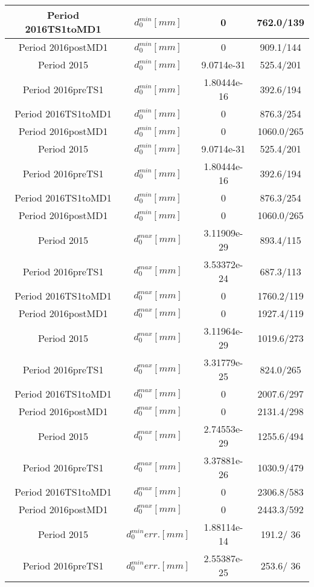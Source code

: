 \documentclass{article}
\begin{document}
\begin{longtable}{c|c|c|c}
\hline
 Period 2016TS1toMD1 & $d_{0}^{min} [mm]$ & 0 & 762.0/139\\
\hline
 Period 2016postMD1 & $d_{0}^{min} [mm]$ & 0 & 909.1/144\\
\hline
 Period 2015 & $d_{0}^{min} [mm]$ & 9.0714e-31 & 525.4/201\\
\hline
 Period 2016preTS1 & $d_{0}^{min} [mm]$ & 1.80444e-16 & 392.6/194\\
\hline
 Period 2016TS1toMD1 & $d_{0}^{min} [mm]$ & 0 & 876.3/254\\
\hline
 Period 2016postMD1 & $d_{0}^{min} [mm]$ & 0 & 1060.0/265\\
\hline
 Period 2015 & $d_{0}^{min} [mm]$ & 9.0714e-31 & 525.4/201\\
\hline
 Period 2016preTS1 & $d_{0}^{min} [mm]$ & 1.80444e-16 & 392.6/194\\
\hline
 Period 2016TS1toMD1 & $d_{0}^{min} [mm]$ & 0 & 876.3/254\\
\hline
 Period 2016postMD1 & $d_{0}^{min} [mm]$ & 0 & 1060.0/265\\
\hline
 Period 2015 & $d_{0}^{max} [mm]$ & 3.11909e-29 & 893.4/115\\
\hline
 Period 2016preTS1 & $d_{0}^{max} [mm]$ & 3.53372e-24 & 687.3/113\\
\hline
 Period 2016TS1toMD1 & $d_{0}^{max} [mm]$ & 0 & 1760.2/119\\
\hline
 Period 2016postMD1 & $d_{0}^{max} [mm]$ & 0 & 1927.4/119\\
\hline
 Period 2015 & $d_{0}^{max} [mm]$ & 3.11964e-29 & 1019.6/273\\
\hline
 Period 2016preTS1 & $d_{0}^{max} [mm]$ & 3.31779e-25 & 824.0/265\\
\hline
 Period 2016TS1toMD1 & $d_{0}^{max} [mm]$ & 0 & 2007.6/297\\
\hline
 Period 2016postMD1 & $d_{0}^{max} [mm]$ & 0 & 2131.4/298\\
\hline
 Period 2015 & $d_{0}^{max} [mm]$ & 2.74553e-29 & 1255.6/494\\
\hline
 Period 2016preTS1 & $d_{0}^{max} [mm]$ & 3.37881e-26 & 1030.9/479\\
\hline
 Period 2016TS1toMD1 & $d_{0}^{max} [mm]$ & 0 & 2306.8/583\\
\hline
 Period 2016postMD1 & $d_{0}^{max} [mm]$ & 0 & 2443.3/592\\
\hline
 Period 2015 & $d_{0}^{min} err. [mm]$ & 1.88114e-14 & 191.2/ 36\\
\hline
 Period 2016preTS1 & $d_{0}^{min} err. [mm]$ & 2.55387e-25 & 253.6/ 36\\

\end{longtable}
\end{document}
